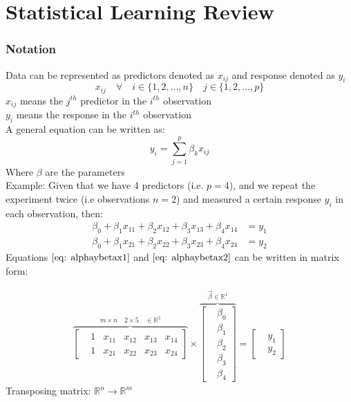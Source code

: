 \documentclass[12pt,a4paper]{report}
\begin{document}
\part{Statistical Learning Review}

\section{Notation}
Data can be represented as predictors denoted as $x_{ij}$ and response denoted as $y_{i}$ \[ x_{ij} \quad \forall  \quad i \in \{1, 2, \dots, n\} \quad j \in \{1, 2, \dots, p\} \]
$x_{ij}$ means the $j^{th}$  predictor in the $i^{th}$ observation\\
$y_{i}$ means the response in the $i^{th}$ observation\\
A general equation can be written as:
\[ 
y_{i}= \sum_{j=1}^{p} \beta_{k} x_{ij}
\]
Where  $\beta$ are the parameters \\
Example: Given that we have 4 predictors (i.e. $p=4$), and we repeat the experiment twice (i.e observations $n=2$) and measured a certain response $y_{i}$ in each observation, then:
\begin{align}
 \beta_{0} + \beta_{1}x_{11} + \beta_{2}x_{12} + \beta_{3}x_{13} + \beta_{4}x_{14} &= y_{1} \label{eq: alphaybetax1}\\
 \beta_{0} + \beta_{1}x_{21} + \beta_{2}x_{22} + \beta_{3}x_{23} + \beta_{4}x_{24} &= y_{2} \label{eq: alphaybetax2}
\end{align}
Equations $\eqref{eq: alphaybetax1}$ and $\eqref{eq: alphaybetax2}$ can be written in matrix form: 

\begin{align}
\overbrace{
\begin{bmatrix}
&1 & x_{11} & x_{12} & x_{13} & x_{14} \\
&1 & x_{21} & x_{22} & x_{23} & x_{24} 
\end{bmatrix} }^{m \times n \quad  2 \times 5 \quad \in \mathbb{R}^5 }
\times
\overbrace{ \begin{bmatrix}
& \beta_{0} \\& \beta_{1} \\& \beta_{2} \\& \beta_{3} \\& \beta_{4} 
\end{bmatrix} }^{\vec{\beta} \in \mathbb{R}^{1}}
=
\begin{bmatrix}
&  y_{1} \\ & y_{2}
\end{bmatrix}
\end{align}
Transposing matrix:  $\mathbb{R}^n \to \mathbb{R}^m $
\end{document}
